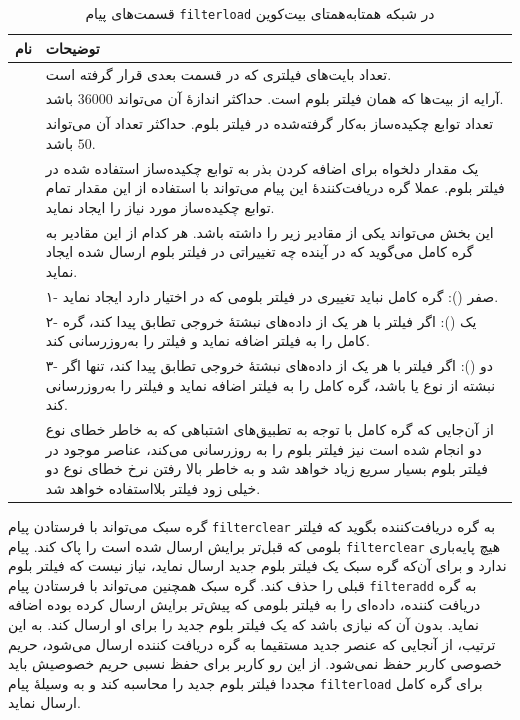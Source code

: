 \begin{xltabular}{\textwidth}{|c|X|}
	\caption{
		قسمت‌های پیام \texttt{filterload} در شبکه همتا‌به‌همتای بیت‌کوین
		\label{table:filterloadMessage}}\\
	\hline
	\textbf{نام} & {\textbf{توضیحات}} \\
	\hline \hline
	 &{%
تعداد بایت‌های فیلتری که در قسمت بعدی قرار گرفته است.	
}\\
\hline
	 &{%
	آر‌ایه از بیت‌ها که همان فیلتر بلوم است. حداکثر اندازهٔ آن می‌تواند $36000$ باشد.
}\\
\hline
	 &{%
	تعداد توابع چکیده‌ساز به‌کار گرفته‌شده در فیلتر بلوم. حداکثر تعداد آن می‌تواند $50$ باشد.
}\\
\hline
	 &{%
	یک مقدار دلخواه برای اضافه کردن بذر به توابع چکیده‌ساز استفاده شده در فیلتر بلوم. عملا گره دریافت‌کنندهٔ این پیام می‌تواند با استفاده از این مقدار تمام توابع چکیده‌ساز مورد نیاز را ایجاد نماید.
}\\
\hline
	 &{%
	این بخش می‌تواند یکی از مقادیر زیر را داشته باشد. هر کدام از این مقادیر به گره کامل می‌گوید که در آینده چه تغییراتی در فیلتر بلوم ارسال شده ایجاد نماید.
}\\
&{%
۱- صفر (): گره کامل نباید تغییری در فیلتر بلومی که در اختیار دارد ایجاد نماید.
}\\
&{%
۲- یک (): اگر فیلتر با هر یک از داده‌های نبشتهٔ خروجی تطابق پیدا کند، گره کامل  را به فیلتر اضافه نماید و فیلتر را به‌روزرسانی کند.
}\\
&{%
	۳- دو (): اگر فیلتر با هر یک از داده‌های نبشتهٔ خروجی تطابق پیدا کند، تنها اگر نبشته از نوع  یا  باشد، گره کامل  را به فیلتر اضافه نماید و فیلتر را به‌روزرسانی کند.
}\\
&{%
	از آن‌جایی که گره کامل با توجه به تطبیق‌های اشتباهی که به خاطر خطای نوع دو انجام شده است نیز فیلتر بلوم را به روزرسانی می‌کند، عناصر موجود در فیلتر بلوم بسیار سریع زیاد خواهد شد و به خاطر بالا رفتن نرخ خطای نوع دو خیلی زود فیلتر بلااستفاده خواهد شد.
}\\
\hline
	
\end{xltabular}

گره سبک می‌تواند با فرستادن پیام \texttt{filterclear} به گره دریافت‌کننده بگوید که فیلتر بلومی که قبل‌تر برایش ارسال شده است را پاک کند. پیام \texttt{filterclear} هیچ پایه‌باری ندارد و برای آن‌که گره سبک یک فیلتر بلوم جدید ارسال نماید، نیاز نیست که فیلتر بلوم قبلی را حذف کند. گره سبک همچنین می‌تواند با فرستادن پیام \texttt{filteradd} به گره دریافت کننده، داده‌ای را به فیلتر بلومی که پیش‌تر برایش ارسال کرده بوده اضافه نماید. بدون آن که نیازی باشد که یک فیلتر بلوم جدید را برای او ارسال کند. به ‌این ترتیب،‌ از آنجایی که عنصر جدید مستقیما به گره دریافت کننده ارسال می‌شود، حریم خصوصی کاربر حفظ نمی‌شود. از این رو کاربر برای حفظ نسبی حریم خصوصیش باید مجددا فیلتر بلوم جدید را محاسبه کند و به وسیلهٔ پیام \texttt{filterload} برای گره کامل ارسال نماید.


